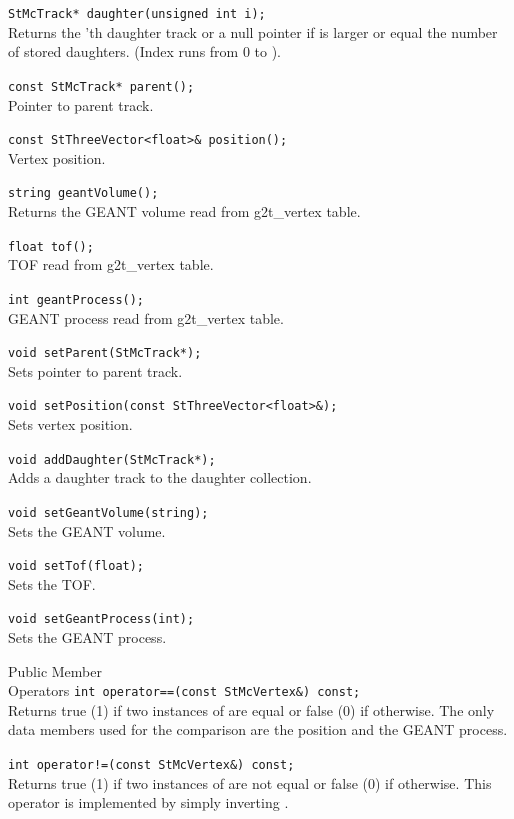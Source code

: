 \begin{Entry}
    \verb+StMcTrack* daughter(unsigned int i);+\\
    Returns the 'th daughter track or a null pointer
    if  is larger or equal the number of stored daughters.
    (Index runs from 0 to ).

    \verb+const StMcTrack* parent();+\\
    Pointer to parent track.

    \verb+const StThreeVector<float>& position();+\\
    Vertex position.

    \verb+string geantVolume();+\\
    Returns the GEANT volume read from g2t\_vertex table.

    \verb+float tof();+\\
    TOF read from g2t\_vertex table.

    \verb+int geantProcess();+\\
    GEANT process read from g2t\_vertex table.

    \verb+void setParent(StMcTrack*);+\\
    Sets pointer to parent track.

    \verb+void setPosition(const StThreeVector<float>&);+\\
    Sets vertex position.

    \verb+void addDaughter(StMcTrack*); +\\
    Adds a daughter track to the daughter collection.

    \verb+void setGeantVolume(string); +\\
    Sets the GEANT volume.

    \verb+void setTof(float); +\\
    Sets the TOF.

    \verb+void setGeantProcess(int); +\\
    Sets the GEANT process.

\item[Public Member\\ Operators]
    \verb+int operator==(const StMcVertex&) const;+\\
    Returns true (1) if two instances of  are equal or false (0)
    if otherwise.
    The only data members used for the comparison are the position and the
    GEANT process.

    \verb+int operator!=(const StMcVertex&) const;+\\
    Returns true (1) if two instances of  are not equal or false (0)
    if otherwise.
    This operator is implemented by simply inverting .


\end{Entry}
